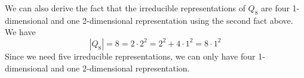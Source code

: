 \documentclass[a4paper,11pt,oneside]{article}
\begin{document}
{{            We can also derive the fact that the irreducible representations of \(Q_8\) are four 1-dimensional and one 2-dimensional representation using the second fact above. We have
            \[|Q_8| = 8 = 2 \cdot 2^2 = 2^2 + 4 \cdot 1^2 = 8 \cdot 1^2\]
            Since we need five irreducible representations, we can only have four 1-dimensional and one 2-dimensional representation.
        }

    }
\end{document}

